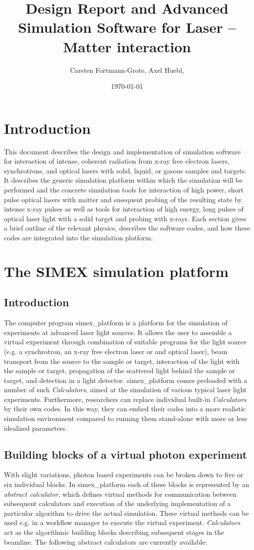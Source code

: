 \documentclass[a4paper]{article}
\title{Design Report and Advanced Simulation Software for Laser -- Matter interaction}
\author{Carsten Fortmann-Grote, Axel Huebl, } %
\date{\today}
\begin{document}
\maketitle
\section{Introduction}
This document describes the design and implementation of simulation software for interaction of intense, coherent radiation from x-ray free
electron lasers, synchrotrons, and optical lasers with solid, liquid, or gasous samples and targets.
It describes the generic simulation platform within which the simulation will be performed and the
concrete simulation tools for interaction of high power, short pulse optical lasers with matter and susequent
probing of the resulting state by intense x-ray pulses as well as tools for interaction of high energy,
long pulses of optical laser light with a solid target and probing with x-rays. Each section gives a brief outline of the relevant physics,
describes the software codes, and how these codes are integrated into the simulation platform.
%
\section{The SIMEX simulation platform \label{sec:simex_platform}}
%
\subsection{Introduction}
The computer program \textsf{simex\_platform} is a platform for the simulation of experiments at advanced laser light sources. It allows the
user to assemble a virtual experiment through combination of suitable programs for the light source (e.g. a synchrotron, an x-ray free electron
laser or and optical laser), beam transport from the source to the sample or target, interaction of the light with the sample or target,
propagation of the scattered light behind the sample or target, and detection in a light detector. \textsf{simex\_platform} comes preloaded with
a number of such \textit{Calculators}, aimed at the simulation of various typical laser light experiments. Furthermore, researchers
can replace individual built-in \textit{Calculators} by their own codes. In this way, they can embed their codes
into a more realistic simulation environment compared to running them stand-alone with more or less idealized parameters.
%
\subsection{Building blocks of a virtual photon experiment}
With slight variations, photon based experiments can be broken down to five or six individual blocks. In simex\_platform each of these blocks is
represented by an \textit{abstract calculator}, which defines virtual methods for communication between subsequent calculators and execution of
the underlying implementation of a particular algorithm to drive the actual simulation. These virtual methods can be used e.g. in a workflow manager
to execute the virtual experiment.
\textit{Calculators} act as the algorithmic building blocks describing subsequent stages in the beamline. The following
abstract calculators are currently available:
\end{document}
